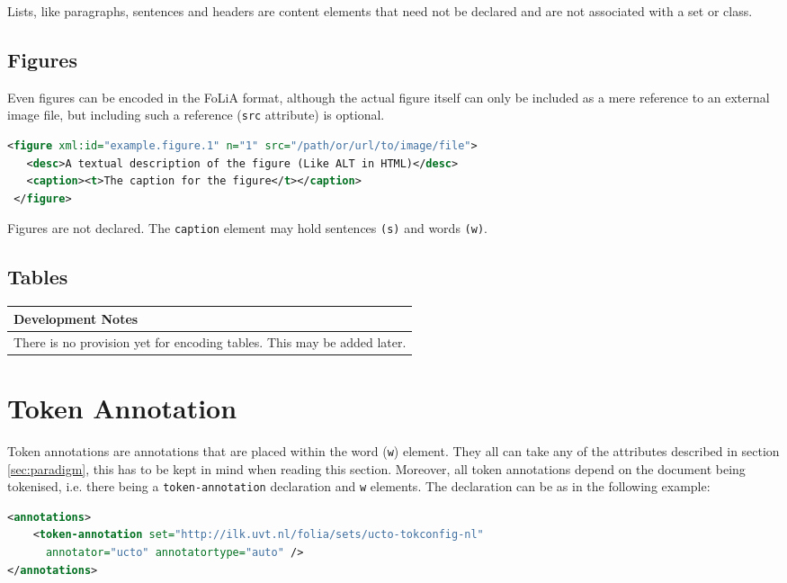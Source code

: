 \documentclass[a4paper,12pt]{report}
\newenvironment{devnotes}
{
\begin{center}
    \begin{tabular}[h!]{|p{0.8\textwidth}|}
    \hline
    {\bf Development Notes}\\\hline}
{   \\\hline
    \end{tabular}
\end{center}}
\begin{document}
Lists, like paragraphs, sentences and headers are content elements that need not be declared and are not associated with a set or class.

\subsection{Figures}

Even figures can be encoded in the FoLiA format, although the actual figure itself can only be included as a mere reference to an external image file, but including such a reference (\texttt{src} attribute) is optional.

\begin{lstlisting}[language=xml]
 <figure xml:id="example.figure.1" n="1" src="/path/or/url/to/image/file">
   <desc>A textual description of the figure (Like ALT in HTML)</desc>
   <caption><t>The caption for the figure</t></caption>
 </figure>
\end{lstlisting}

Figures are not declared. The \texttt{caption} element may hold sentences \texttt{(s)} and words \texttt{(w)}.

\subsection{Tables}

\begin{devnotes}
There is no provision yet for encoding tables. This may be added later.
\end{devnotes}

\section{Token Annotation}

Token annotations are annotations that are placed within the word (\texttt{w}) element. They all can take any of the attributes described in section \ref{sec:paradigm}, this has to be kept in mind when reading this section. Moreover, all token annotations depend on the document being tokenised, i.e. there being a \texttt{token-annotation} declaration and \texttt{w} elements. The declaration can be as in the following example:

\begin{lstlisting}[language=xml]
<annotations>
    <token-annotation set="http://ilk.uvt.nl/folia/sets/ucto-tokconfig-nl"
      annotator="ucto" annotatortype="auto" />
</annotations>
\end{lstlisting}
\end{document}

